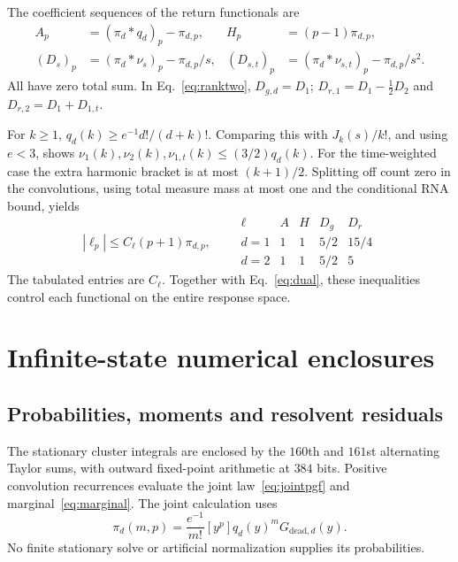 The coefficient sequences of the return functionals are
\begin{align}
 A_p&=(\pi_d*q_d)_p-\pi_{d,p},&
 H_p&=(p-1)\pi_{d,p},\nonumber\\
 (D_s)_p&=(\pi_d*\nu_s)_p-\pi_{d,p}/s,&
 (D_{s,t})_p&=(\pi_d*\nu_{s,t})_p-\pi_{d,p}/s^2.
 \label{eq:coefficients}
\end{align}
All have zero total sum. In Eq.~\eqref{eq:ranktwo},
$D_{g,d}=D_1$;
$D_{r,1}=D_1-\tfrac12D_2$ and
$D_{r,2}=D_1+D_{1,t}$.

For $k\geq1$,
$q_d(k)\geq e^{-1}d!/(d+k)!$. Comparing this with $J_k(s)/k!$,
and using $e<3$, shows
$\nu_1(k),\nu_2(k),\nu_{1,t}(k)\leq(3/2)q_d(k)$.
For the time-weighted case the extra harmonic bracket is at most
$(k+1)/2$. Splitting off count zero in the convolutions, using total
measure mass at most one and the conditional RNA bound, yields
\begin{equation}
 |\ell_p|\leq C_\ell(p+1)\pi_{d,p},\qquad
 \begin{array}{c|cccc}
 \ell&A&H&D_g&D_r\\ \hline
 d=1&1&1&5/2&15/4\\
 d=2&1&1&5/2&5
 \end{array}
 \label{eq:palmconstants}
\end{equation}
The tabulated entries are $C_\ell$. Together with
Eq.~\eqref{eq:dual}, these inequalities control each functional on the
entire response space.

\section{Infinite-state numerical enclosures}
\label{app:certificate}

\subsection{Probabilities, moments and resolvent residuals}

The stationary cluster integrals are enclosed by the $160$th and
$161$st alternating Taylor sums, with outward fixed-point arithmetic
at $384$ bits. Positive convolution recurrences evaluate the joint
law~\eqref{eq:jointpgf} and marginal~\eqref{eq:marginal}.
The joint calculation uses
\begin{equation}
 \pi_d(m,p)=\frac{e^{-1}}{m!}
              [y^p]q_d(y)^mG_{\mathrm{dead},d}(y).
\end{equation}
No finite stationary solve or artificial normalization supplies its
probabilities.

